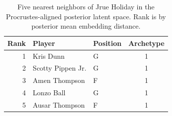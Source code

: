 \begin{table}[htbp]
  \centering\small
  \begin{tabular}{rllc}
    \toprule
    Rank & Player & Position & Archetype \\
    \midrule
    1 & Kris Dunn & G & 1 \\
    2 & Scotty Pippen Jr. & G & 1 \\
    3 & Amen Thompson & F & 1 \\
    4 & Lonzo Ball & G & 1 \\
    5 & Ausar Thompson & F & 1 \\
    \bottomrule
  \end{tabular}
  \caption{Five nearest neighbors of Jrue Holiday in the Procrustes-aligned posterior latent space. Rank is by posterior mean embedding distance.}
  \label{tab:Jrue_Holiday_neighbors}
\end{table}

